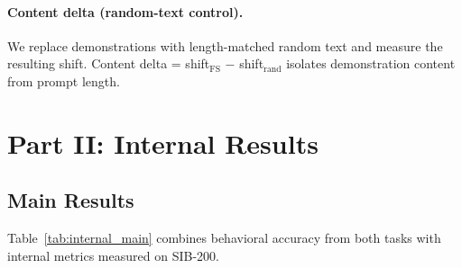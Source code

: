 \documentclass[11pt,a4paper]{article}
\begin{document}
\paragraph{Content delta (random-text control).} We replace demonstrations with length-matched random text and measure the resulting shift. Content delta = shift$_{\text{FS}}$ $-$ shift$_{\text{rand}}$ isolates demonstration content from prompt length.

\section{Part II: Internal Results}
\label{sec:internal_results}

\subsection{Main Results}

Table~\ref{tab:internal_main} combines behavioral accuracy from both tasks with internal metrics measured on SIB-200.
\end{document}
